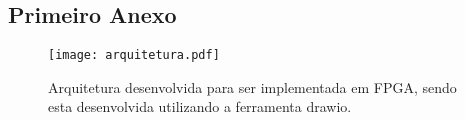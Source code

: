 \begin{anexosenv}

\chapter{Primeiro Anexo}

\begin{figure}[H]
    \centering
   \texttt{[image: arquitetura.pdf]}
  \caption{Arquitetura desenvolvida para ser implementada em FPGA, sendo esta desenvolvida utilizando a ferramenta drawio.}
   \label{arquitetura1}
    \end{figure}
	

\end{anexosenv}

